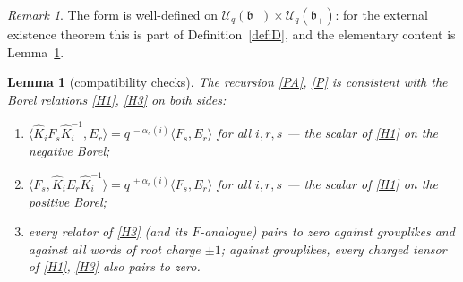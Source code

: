 \documentclass[11pt]{article}
\newtheorem{lemma}[theorem]{Lemma}
\theoremstyle{definition}
\theoremstyle{remark}
\newtheorem{remark}[theorem]{Remark}
\newcommand{\la}{\langle}
\newcommand{\ra}{\rangle}
\newcommand{\Uq}{\mathcal{U}_q}
\newcommand{\bp}{\mathfrak{b}_+}
\newcommand{\bm}{\mathfrak{b}_-}
\newcommand{\hK}{\hat K}
\begin{document}
\begin{remark}\label{rem:compatSK}
The form is well-defined on $\Uq(\bm)\times\Uq(\bp)$: for the
external existence theorem this is part of Definition~\ref{def:D},
and the elementary content is Lemma~\ref{lem:compat}.
\end{remark}

\begin{lemma}[compatibility checks]\label{lem:compat}
The recursion \eqref{PA}, \eqref{P} is consistent with the Borel
relations \eqref{H1}, \eqref{H3} on both sides:
\begin{enumerate}[label=(\roman*),leftmargin=2.4em]
\item\label{Cist} $\la\hK_iF_s\hK_i^{-1},E_r\ra
 =q^{\,-\alpha_s(i)}\la F_s,E_r\ra$ for all $i,r,s$ — the scalar of
 \eqref{H1} on the negative Borel;
\item\label{Cist2} $\la F_s,\hK_iE_r\hK_i^{-1}\ra
 =q^{\,+\alpha_r(i)}\la F_s,E_r\ra$ for all $i,r,s$ — the scalar of
 \eqref{H1} on the positive Borel;
\item\label{Ci} every relator of \eqref{H3} (and its $F$-analogue)
 pairs to zero against grouplikes and against all words of root
 charge $\pm1$; against grouplikes, every charged tensor of
 \eqref{H1}, \eqref{H3} also pairs to zero.
\end{enumerate}
\end{lemma}
\end{document}
